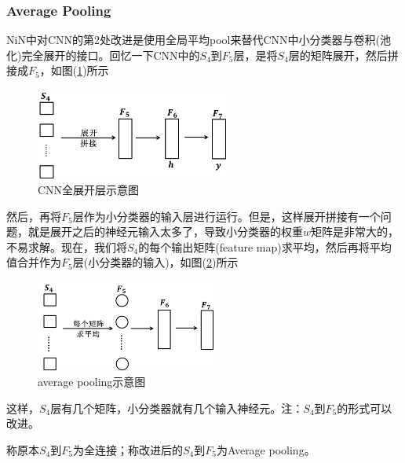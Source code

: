         \subsubsection{Average Pooling}
            \par
            NiN\cite{2014.MinLin}中对CNN的第2处改进是使用全局平均pool来替代CNN中小分类器与卷积(池化)完全展开的接口。回忆一下CNN中的$S_4$到$F_5$层，是将$S_4$层的矩阵展开，然后拼接成$F_5$，如图(\ref{fig:CNN全展开层示意图})所示
             \begin{figure}[H]
            \centering
            \includegraphics[height=3cm]{images/CNN_full_expanded_layer_diagram.jpg}
            \caption{CNN全展开层示意图}
            \label{fig:CNN全展开层示意图}
            \end{figure}
            然后，再将$F_5$层作为小分类器的输入层进行运行。但是，这样展开拼接有一个问题，就是展开之后的神经元输入太多了，导致小分类器的权重$w$矩阵是非常大的，不易求解。现在，我们将$S_4$的每个输出矩阵(feature map)求平均，然后再将平均值合并作为$F_5$层(小分类器的输入)，如图(\ref{fig:average pooling示意图})所示
             \begin{figure}[H]
            \centering
            \includegraphics[height=3cm]{images/average_pooling.jpg}
            \caption{average pooling示意图}
            \label{fig:average pooling示意图}
            \end{figure}
            这样，$S_4$层有几个矩阵，小分类器就有几个输入神经元。注：$S_4$到$F_5$的形式可以改进。
            \par
            称原本$S_4$到$F_5$为全连接；称改进后的$S_4$到$F_5$为Average pooling。
